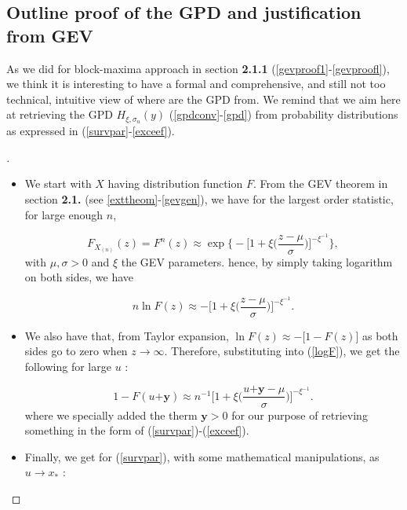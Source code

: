 \documentclass[11pt,a4paper,openany ]{book}
\begin{document}
\subsection{Outline proof of the GPD and justification from GEV} As we did for block-maxima approach in section \textbf{2.1.1} (\ref{gevproof1}-\ref{gevproofl}), we think it is interesting to have a formal and comprehensive, and still not too technical, intuitive view of where are the GPD from. We remind that we aim here at retrieving the GPD $H_{\xi,\sigma_u}(y)$ (\ref{gpdconv}-\ref{gpd}) from probability distributions as expressed in (\ref{survpar}-\ref{exceef}).

\begin{proof}[\nopunct ] 
\ \ \ \begin{itemize}
	 \item We start with $X$ having distribution function $F$. From the GEV theorem in section %
	 \textbf{2.1.} (see \ref{exttheom}-\ref{gevgen}), we have for the largest order statistic, for large enough $n$,  
	
	\begin{equation}
	F_{X_{(n)}}(z)=F^n(z)\approx \exp\Bigg\{ -\bigg[1+\xi\bigg(\frac{z-\mu}{\sigma}\bigg)\bigg]^{-\xi^{-1}}\Bigg\},
	\end{equation} 
	with $\mu,\sigma>0$ and $\xi$ the GEV parameters. hence, by simply taking logarithm on both sides, we have
	
	\begin{equation} \label{logF}
	n \ln F(z)\approx -\Bigg[1+\xi\bigg(\frac{z-\mu}{\sigma}\bigg)\Bigg]^{-\xi^{-1}}.
	\end{equation}
		\item We also have that, from Taylor expansion,
		$\ln F(z)\approx -\big[1-F(z)\big]$
		as both sides go to zero when $z\rightarrow\infty$. Therefore, substituting into (\ref{logF}), we get the following for large $u$ :
		
		\begin{equation*}
		1-F(u\boldsymbol{+y})\approx n^{-1}\bigg[1+\xi\bigg(\frac{u\boldsymbol{+y}-\mu}{\sigma}\bigg)\bigg]^{-\xi^{-1}}.
		\end{equation*}
		where we specially added the therm $\boldsymbol{y}>0$ for our purpose of retrieving something in the form of 
		(\ref{survpar})-(\ref{exceef}). 
		
		\item Finally, we get for (\ref{survpar}), with some mathematical manipulations, as 
		$u\rightarrow x_*$ :
		

\end{itemize}
\end{proof}
\end{document}
